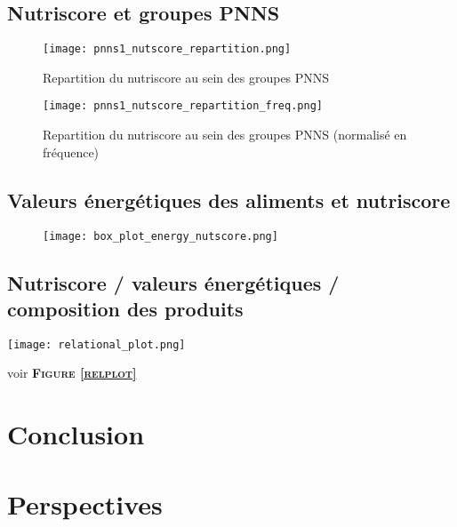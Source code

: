   \subsection{Nutriscore et groupes PNNS}
  \begin{figure}[H]
    \texttt{[image: pnns1\_nutscore\_repartition.png]}
    \caption{Repartition du nutriscore au sein des groupes PNNS}
    \label{}
  \end{figure}
  \begin{figure}[H]
    \texttt{[image: pnns1\_nutscore\_repartition\_freq.png]}
    \caption{Repartition du nutriscore au sein des groupes PNNS (normalisé en fréquence)}
    \label{}
  \end{figure}

  \begin{table}[H]
    \footnotesize\setlength{\tabcolsep}{2.5pt}
    \caption{Tableau de contingence groupe PNNS et Nutriscore}
    \label{}
    
  \end{table}

  \subsection{Valeurs énergétiques des aliments et nutriscore}
  \begin{figure}
    \texttt{[image: box\_plot\_energy\_nutscore.png]}
    \caption{}
    \label{}
  \end{figure}

  \subsection{Nutriscore / valeurs énergétiques / composition des produits}


  \begin{figure*}[h]
    \texttt{[image: relational\_plot.png]}
    \caption{}
    \label{relplot}
  \end{figure*}

  voir \textsc{\bf{Figure \ref{relplot}}}
\section{Conclusion}

\section{Perspectives}


